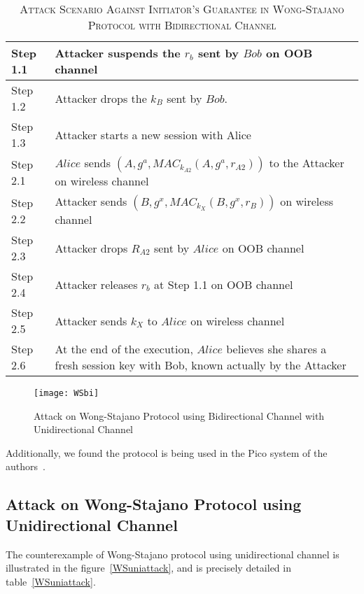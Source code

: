 \begin{table}[t]
\centering
\caption{\textsc{Attack Scenario Against Initiator's Guarantee in Wong-Stajano Protocol with Bidirectional Channel}}
\label{WSbiattacktable}
{\small
\begin{tabular}{| l | p{11cm} |}
 \hline
 Step 1.1 & Attacker suspends the $r_b$ sent by $Bob$ on OOB channel\\ \hline
 Step 1.2 & Attacker drops the $k_B$ sent by $Bob$. \\ \hline
 Step 1.3 & Attacker starts a new session with Alice\\ \hline \hline
 Step 2.1 & $Alice$ sends $(A, g^{a}, MAC_{k_{A2}}(A,g^{a},r_{A2}))$ to the Attacker on wireless channel\\ \hline
 Step 2.2 & Attacker sends $(B, g^{x}, MAC_{k_X}(B,g^{x},r_{B}))$ on wireless channel\\ \hline
 Step 2.3 & Attacker drops $R_{A2}$ sent by $Alice$ on OOB channel\\ \hline
 Step 2.4 & Attacker releases $r_b$ at Step 1.1 on OOB channel \\ \hline
 Step 2.5 & Attacker sends $k_X$ to $Alice$ on wireless channel\\ \hline
 Step 2.6 & At the end of the execution, $Alice$ believes she shares a fresh session key with Bob, known actually by the Attacker\\ \hline
\end{tabular}
}
\end{table}

\begin{figure}
  \centering
  \texttt{[image: WSbi]}
  \caption{Attack on Wong-Stajano Protocol using Bidirectional Channel with Unidirectional Channel}
  \label{WSbiattack}
\end{figure}

Additionally, we found the protocol is being used in the Pico system of the authors~\cite{Stajano:2014aa}. 
 
\subsection{Attack on Wong-Stajano Protocol using Unidirectional Channel}\label{flawsuniWS}

The counterexample of Wong-Stajano protocol using unidirectional channel is illustrated in the figure~\ref{WSuniattack}, and is precisely detailed in table~\ref{WSuniattack}. 

